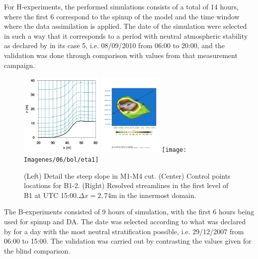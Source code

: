 For H-experiments, the performed simulations consists of a total of 14 hours, where the first 6 correspond to the spinup of the model and the time window where the data assimilation is applied. The date of the simulation were selected in such a way that it corresponds to a period with neutral atmospheric stability as declared by \cite{Pea2013} in its case 5, i.e. 08/09/2010 from 06:00 to 20:00, and the validation was done through comparison with values from that measurement campaign.
\begin{figure}[H]
	\centering
	\includegraphics[height=4cm,trim={0cm 5mm 0cm 0cm},clip]{Imagenes/05/hd_mesh_50}%
	\includegraphics[height=4cm,page=1,trim={3.4cm 9.3cm 1cm 4cm},clip]{Imagenes/05/bol_control_point.pdf}%
	\texttt{[image: Imagenes/06/bol/eta1]}%
	\caption{(Left) Detail the steep slope in M1-M4 cut. (Center) Control points locations for B1-2. (Right)  Resolved streamlines in the first level of B1 at UTC 15:00.$\Delta x = 2,74$m in the innermost domain.}
	\label{fig:05_mesh_bol}
\end{figure}

The B-experiments consisted of 9 hours of simulation, with the first 6 hours being used for spinup and DA. The date was selected according to what was declared by  \cite{Bechmann2009} for a day with the most neutral stratification possible, i.e. 29/12/2007 from 06:00 to 15:00. The validation was carried out by contrasting the values given for the blind comparison.

